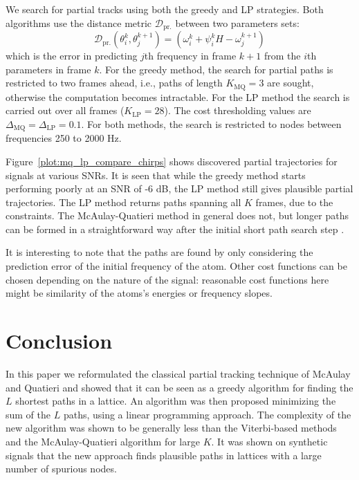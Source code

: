 \documentclass{article}
\begin{document}
\begin{sloppy}
We search for partial tracks using both the greedy and LP strategies. Both
algorithms use the distance metric $\mathcal{D}_{\text{pr.}}$ between two parameters sets:
\begin{equation}
    \label{eq:examplecostfun}
    \mathcal{D}_{\text{pr.}} \left( \theta_{i}^{k},
    \theta_{j}^{k+1} \right) = \left( \omega_{i}^{k} +
    \psi_{i}^{k} H - \omega_{j}^{k+1} \right)
\end{equation}
which is the error in predicting $j$th frequency in frame $k+1$ from the $i$th
parameters in frame $k$. For the greedy method, the search for partial paths is
restricted to two frames ahead, i.e., paths of length $K_{\text{MQ}}=3$ are sought, otherwise the
computation becomes intractable. For the LP
method the search is carried out over all frames ($K_{\text{LP}}=28$).
The cost thresholding values are ${\Delta_{\text{MQ}} = \Delta_{\text{LP}} =
0.1}$. For both methods, the search is restricted
to nodes between frequencies 250 to 2000 Hz.

Figure~\ref{plot:mq_lp_compare_chirps}
shows discovered partial trajectories for signals at various SNRs. It is seen
that while the greedy method starts performing poorly at an SNR of -6 dB, the LP method
still gives plausible partial trajectories. The LP method returns paths spanning
all $K$ frames, due to the constraints. The McAulay-Quatieri method in general does not,
but longer paths can be formed in a straightforward way after the initial short path
search step \cite{mcaulay1986speech}.

It is interesting to note that the paths are found by only considering the
prediction error of the initial frequency of the atom. Other cost functions can
be chosen depending on the nature of the signal: reasonable cost functions here
might be similarity of the atoms's energies or frequency slopes.

\section{Conclusion}

In this paper we reformulated the classical partial tracking technique of McAulay and
Quatieri and showed that it can be seen as a greedy algorithm for finding the $L$
shortest paths in a lattice. An algorithm was then proposed minimizing the sum
of the $L$ paths, using a linear programming approach. The complexity of the new
algorithm was shown to be generally less than the Viterbi-based methods and
the McAulay-Quatieri algorithm for large $K$.
It was shown on synthetic signals that the new approach finds plausible paths in
lattices with a large number of spurious nodes.


\end{sloppy}
\end{document}
